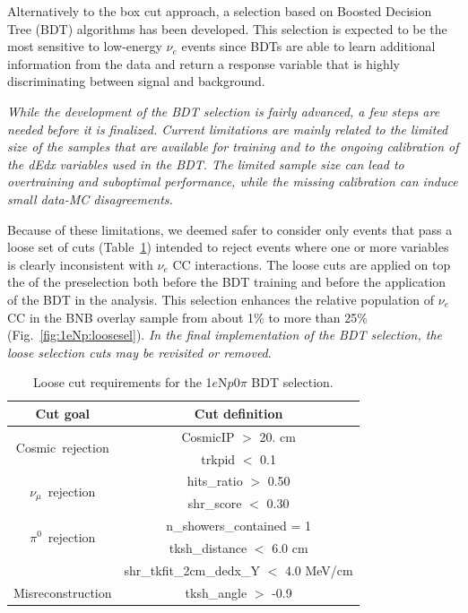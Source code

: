 \documentclass[a4paper]{article}
\newcommand{\nue}{$\nu_e$ }
\newcommand{\npsel}{1$e$N$p$0$\pi$ }
\begin{document}
Alternatively to the box cut approach, a selection based on Boosted Decision Tree (BDT) algorithms has been developed. This selection is expected to be the most sensitive to low-energy \nue events since BDTs are able to learn additional information from the data and return a response variable that is highly discriminating between signal and background. 

\emph{While the development of the BDT selection is fairly advanced, a few steps are needed before it is finalized. Current limitations are mainly related to the limited size of the samples that are available for training and to the ongoing calibration of the dEdx variables used in the BDT. The limited sample size can lead to overtraining and suboptimal performance, while the missing calibration can induce small data-MC disagreements.} 

Because of these limitations, we deemed safer to consider only events that pass a loose set of cuts (Table~\ref{tab:1eNp:loosecut}) intended to reject events where one or more variables is clearly inconsistent with $\nu_e$ CC interactions. The loose cuts are applied on top the of the preselection both before the BDT training and before the application of the BDT in the analysis. This selection enhances the relative population of $\nu_e$ CC in the BNB overlay sample from about 1\% to more than 25\% (Fig.~\ref{fig:1eNp:loosesel}). \emph{In the final implementation of the BDT selection, the loose selection cuts may be revisited or removed}.
\begin{table}[h!]
\centering
\setlength{\tabcolsep}{10pt}
\renewcommand{\arraystretch}{1.25}
 \begin{tabular}{| c | c |} 
 \hline
 Cut goal & Cut definition \\
 \hline\hline
\multirow{2}{*}{Cosmic~rejection} & CosmicIP $>$ 20. \si{\cm} \\
& trkpid $<$ 0.1 \\
 \hline
\multirow{2}{*}{$\nu_\mu$~rejection} & hits\_ratio $>$ 0.50 \\
 & shr\_score $<$ 0.30 \\
 \hline
\multirow{2}{*}{$\pi^0$~rejection} & n\_showers\_contained = 1 \\
& tksh\_distance $<$ 6.0 \si{\cm} \\
& shr\_tkfit\_2cm\_dedx\_Y $<$ 4.0 \si{\MeV}/\si{\cm} \\
 \hline
Misreconstruction & tksh\_angle $>$ -0.9 \\
 \hline
 \end{tabular}
 \caption{\label{tab:1eNp:loosecut} Loose cut requirements for the \npsel BDT selection.}
\end{table}
\end{document}
